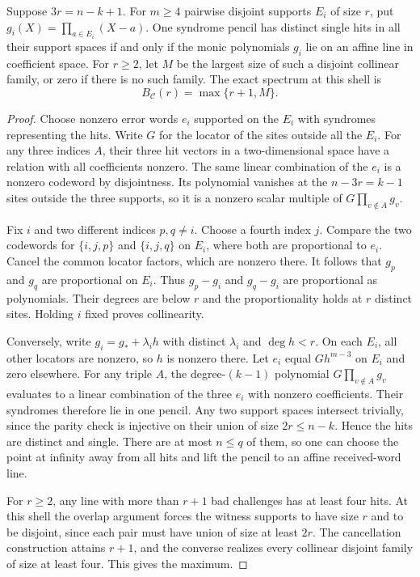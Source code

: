 \begin{theorem}
\label{thm:mca-locator-pencils}
Suppose \(3r=n-k+1\). For \(m\ge4\) pairwise disjoint supports \(E_i\)
of size \(r\), put \(g_i(X)=\prod_{a\in E_i}(X-a)\). One syndrome pencil
has distinct single hits in all their support spaces if and only if the
monic polynomials \(g_i\) lie on an affine line in coefficient space.
For \(r\ge2\), let \(M\) be the largest size of such a disjoint collinear
family, or zero if there is no such family. The exact spectrum at this shell is
\[
 B_{\mathcal C}(r)=\max\{r+1,M\}.
\]
\end{theorem}

\begin{proof}
Choose nonzero error words \(e_i\) supported on the \(E_i\) with syndromes
representing the hits. Write \(G\) for the locator of the sites outside
all the \(E_i\). For any three indices \(A\), their three hit vectors in a
two-dimensional space have a relation with all coefficients nonzero.
The same linear combination of the \(e_i\) is a nonzero codeword by
disjointness. Its polynomial vanishes at the \(n-3r=k-1\) sites outside
the three supports, so it is a nonzero scalar multiple of
\(G\prod_{v\notin A}g_v\).

Fix \(i\) and two different indices \(p,q\ne i\). Choose a fourth index
\(j\). Compare the two codewords for \(\{i,j,p\}\) and \(\{i,j,q\}\) on
\(E_i\), where both are proportional to \(e_i\). Cancel the common
locator factors, which are nonzero there. It follows that \(g_p\) and
\(g_q\) are proportional on \(E_i\). Thus \(g_p-g_i\) and \(g_q-g_i\)
are proportional as polynomials. Their degrees are below \(r\) and the
proportionality holds at \(r\) distinct sites. Holding \(i\) fixed proves
collinearity.

Conversely, write \(g_i=g_*+\lambda_i h\) with distinct \(\lambda_i\) and
\(\deg h<r\). On each \(E_i\), all other locators are nonzero, so \(h\)
is nonzero there. Let \(e_i\) equal \(Gh^{m-3}\) on \(E_i\) and zero
elsewhere. For any triple \(A\), the degree-\((k-1)\) polynomial
\(G\prod_{v\notin A}g_v\) evaluates to a linear combination of the three
\(e_i\) with nonzero coefficients. Their syndromes therefore lie in one
pencil. Any two support spaces intersect trivially, since the parity
check is injective on their union of size \(2r\le n-k\). Hence the hits
are distinct and single. There are at most \(n\le q\) of them, so one can
choose the point at infinity away from all hits and lift the pencil to
an affine received-word line.

For \(r\ge2\), any line with more than \(r+1\) bad challenges has at
least four hits. At this shell the overlap argument forces the witness
supports to have size \(r\) and to be disjoint, since each pair must have
union of size at least \(2r\). The cancellation construction attains
\(r+1\), and the converse realizes every collinear disjoint family of size
at least four. This gives the maximum.
\end{proof}

